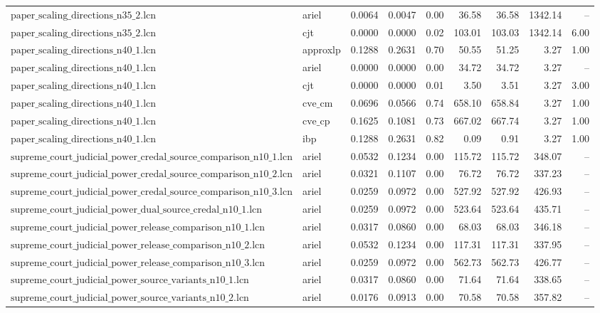 \documentclass{article}
\begin{document}
\begin{table}[ht]
\begin{tabular}{llrrrrrrr}
$\text{paper\_scaling\_directions\_n35\_2.lcn}$ & ariel & 0.0064 & 0.0047 & 0.00 & 36.58 & 36.58 & 1342.14 & -- \\
$\text{paper\_scaling\_directions\_n35\_2.lcn}$ & cjt & 0.0000 & 0.0000 & 0.02 & 103.01 & 103.03 & 1342.14 & 6.00 \\
\hline
$\text{paper\_scaling\_directions\_n40\_1.lcn}$ & approxlp & 0.1288 & 0.2631 & 0.70 & 50.55 & 51.25 & 3.27 & 1.00 \\
$\text{paper\_scaling\_directions\_n40\_1.lcn}$ & ariel & 0.0000 & 0.0000 & 0.00 & 34.72 & 34.72 & 3.27 & -- \\
$\text{paper\_scaling\_directions\_n40\_1.lcn}$ & cjt & 0.0000 & 0.0000 & 0.01 & 3.50 & 3.51 & 3.27 & 3.00 \\
$\text{paper\_scaling\_directions\_n40\_1.lcn}$ & $\text{cve\_cm}$ & 0.0696 & 0.0566 & 0.74 & 658.10 & 658.84 & 3.27 & 1.00 \\
$\text{paper\_scaling\_directions\_n40\_1.lcn}$ & $\text{cve\_cp}$ & 0.1625 & 0.1081 & 0.73 & 667.02 & 667.74 & 3.27 & 1.00 \\
$\text{paper\_scaling\_directions\_n40\_1.lcn}$ & ibp & 0.1288 & 0.2631 & 0.82 & 0.09 & 0.91 & 3.27 & 1.00 \\
\hline
$\text{supreme\_court\_judicial\_power\_credal\_source\_comparison\_n10\_1.lcn}$ & ariel & 0.0532 & 0.1234 & 0.00 & 115.72 & 115.72 & 348.07 & -- \\
$\text{supreme\_court\_judicial\_power\_credal\_source\_comparison\_n10\_2.lcn}$ & ariel & 0.0321 & 0.1107 & 0.00 & 76.72 & 76.72 & 337.23 & -- \\
$\text{supreme\_court\_judicial\_power\_credal\_source\_comparison\_n10\_3.lcn}$ & ariel & 0.0259 & 0.0972 & 0.00 & 527.92 & 527.92 & 426.93 & -- \\
$\text{supreme\_court\_judicial\_power\_dual\_source\_credal\_n10\_1.lcn}$ & ariel & 0.0259 & 0.0972 & 0.00 & 523.64 & 523.64 & 435.71 & -- \\
$\text{supreme\_court\_judicial\_power\_release\_comparison\_n10\_1.lcn}$ & ariel & 0.0317 & 0.0860 & 0.00 & 68.03 & 68.03 & 346.18 & -- \\
$\text{supreme\_court\_judicial\_power\_release\_comparison\_n10\_2.lcn}$ & ariel & 0.0532 & 0.1234 & 0.00 & 117.31 & 117.31 & 337.95 & -- \\
$\text{supreme\_court\_judicial\_power\_release\_comparison\_n10\_3.lcn}$ & ariel & 0.0259 & 0.0972 & 0.00 & 562.73 & 562.73 & 426.77 & -- \\
$\text{supreme\_court\_judicial\_power\_source\_variants\_n10\_1.lcn}$ & ariel & 0.0317 & 0.0860 & 0.00 & 71.64 & 71.64 & 338.65 & -- \\
$\text{supreme\_court\_judicial\_power\_source\_variants\_n10\_2.lcn}$ & ariel & 0.0176 & 0.0913 & 0.00 & 70.58 & 70.58 & 357.82 & -- \\
\bottomrule
\end{tabular}
\end{table}




\end{document}
